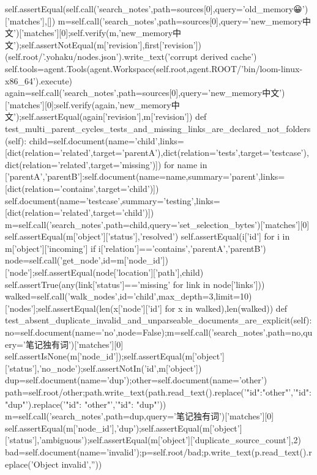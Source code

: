         self.assertEqual(self.call('search_notes',path=sources[0],query='old_memory😀')['matches'],[])
        m=self.call('search_notes',path=sources[0],query='new_memory中文')['matches'][0];self.verify(m,'new_memory中文');self.assertNotEqual(m['revision'],first['revision'])
        (self.root/'.yohaku/nodes.json').write_text('corrupt derived cache')
        self.tools=agent.Tools(agent.Workspace(self.root,agent.ROOT/'bin/loom-linux-x86_64').execute)
        again=self.call('search_notes',path=sources[0],query='new_memory中文')['matches'][0];self.verify(again,'new_memory中文');self.assertEqual(again['revision'],m['revision'])
    def test_multi_parent_cycles_tests_and_missing_links_are_declared_not_folders(self):
        child=self.document(name='child',links=[dict(relation='related',target='parentA'),dict(relation='tests',target='testcase'),dict(relation='related',target='missing')])
        for name in ['parentA','parentB']:self.document(name=name,summary='parent',links=[dict(relation='contains',target='child')])
        self.document(name='testcase',summary='testing',links=[dict(relation='related',target='child')])
        m=self.call('search_notes',path=child,query='set_selection_bytes')['matches'][0]
        self.assertEqual(m['object']['status'],'resolved')
        self.assertEqual({i['id'] for i in m['object']['incoming'] if i['relation']=='contains'},{'parentA','parentB'})
        node=self.call('get_node',id=m['node_id'])['node'];self.assertEqual(node['location']['path'],child)
        self.assertTrue(any(link['status']=='missing' for link in node['links']))
        walked=self.call('walk_nodes',id='child',max_depth=3,limit=10)['nodes'];self.assertEqual(len({x['node']['id'] for x in walked}),len(walked))
    def test_absent_duplicate_invalid_and_unparseable_documents_are_explicit(self):
        no=self.document(name='no',node=False);m=self.call('search_notes',path=no,query='笔记独有词')['matches'][0]
        self.assertIsNone(m['node_id']);self.assertEqual(m['object']['status'],'no_node');self.assertNotIn('id',m['object'])
        dup=self.document(name='dup');other=self.document(name='other')
        path=self.root/other;path.write_text(path.read_text().replace('"id":"other"','"id":"dup"').replace('"id": "other"','"id": "dup"'))
        m=self.call('search_notes',path=dup,query='笔记独有词')['matches'][0]
        self.assertEqual(m['node_id'],'dup');self.assertEqual(m['object']['status'],'ambiguous');self.assertEqual(m['object']['duplicate_source_count'],2)
        bad=self.document(name='invalid');p=self.root/bad;p.write_text(p.read_text().replace('Object invalid',''))
